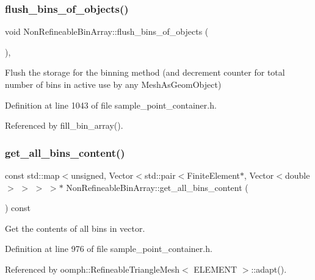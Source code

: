 \subsubsection{\texorpdfstring{flush\+\_\+bins\+\_\+of\+\_\+objects()}{flush\_bins\_of\_objects()}}
{\footnotesize\ttfamily void Non\+Refineable\+Bin\+Array\+::flush\+\_\+bins\+\_\+of\+\_\+objects (\begin{DoxyParamCaption}{ }\end{DoxyParamCaption})\hspace{0.3cm}{\ttfamily [inline]}, {\ttfamily [private]}}



Flush the storage for the binning method (and decrement counter for total number of bins in active use by any Mesh\+As\+Geom\+Object) 



Definition at line 1043 of file sample\+\_\+point\+\_\+container.\+h.



Referenced by fill\+\_\+bin\+\_\+array().

\mbox{\label{classNonRefineableBinArray_a0ee4ab7c5c1f27271ac1666656b15ad6}} 
\subsubsection{\texorpdfstring{get\+\_\+all\+\_\+bins\+\_\+content()}{get\_all\_bins\_content()}}
{\footnotesize\ttfamily const std\+::map$<$unsigned, Vector$<$std\+::pair$<$Finite\+Element$\ast$, Vector$<$double$>$ $>$ $>$ $>$$\ast$ Non\+Refineable\+Bin\+Array\+::get\+\_\+all\+\_\+bins\+\_\+content (\begin{DoxyParamCaption}{ }\end{DoxyParamCaption}) const\hspace{0.3cm}{\ttfamily [inline]}}



Get the contents of all bins in vector. 



Definition at line 976 of file sample\+\_\+point\+\_\+container.\+h.



Referenced by oomph\+::\+Refineable\+Triangle\+Mesh$<$ E\+L\+E\+M\+E\+N\+T $>$\+::adapt().

